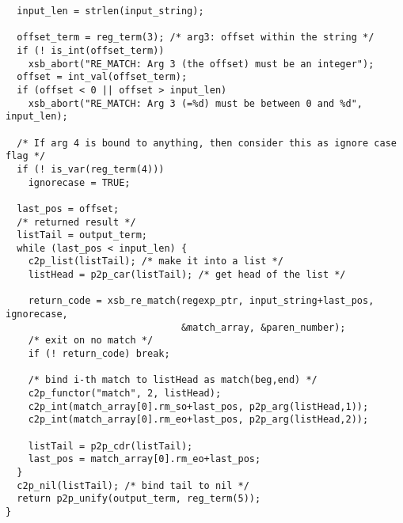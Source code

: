 \begin{verbatim}
  input_len = strlen(input_string);
  
  offset_term = reg_term(3); /* arg3: offset within the string */
  if (! is_int(offset_term))
    xsb_abort("RE_MATCH: Arg 3 (the offset) must be an integer");
  offset = int_val(offset_term);
  if (offset < 0 || offset > input_len)
    xsb_abort("RE_MATCH: Arg 3 (=%d) must be between 0 and %d", input_len);

  /* If arg 4 is bound to anything, then consider this as ignore case flag */
  if (! is_var(reg_term(4)))
    ignorecase = TRUE;

  last_pos = offset;
  /* returned result */
  listTail = output_term;
  while (last_pos < input_len) {
    c2p_list(listTail); /* make it into a list */
    listHead = p2p_car(listTail); /* get head of the list */

    return_code = xsb_re_match(regexp_ptr, input_string+last_pos, ignorecase,
                               &match_array, &paren_number);
    /* exit on no match */
    if (! return_code) break;

    /* bind i-th match to listHead as match(beg,end) */
    c2p_functor("match", 2, listHead);
    c2p_int(match_array[0].rm_so+last_pos, p2p_arg(listHead,1));
    c2p_int(match_array[0].rm_eo+last_pos, p2p_arg(listHead,2));

    listTail = p2p_cdr(listTail);
    last_pos = match_array[0].rm_eo+last_pos;
  }
  c2p_nil(listTail); /* bind tail to nil */
  return p2p_unify(output_term, reg_term(5));
}
\end{verbatim}



